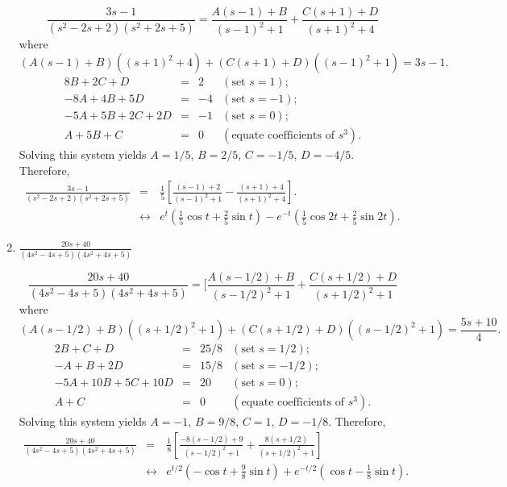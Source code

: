 \documentclass{ximera}
\begin{document}
\begin{problem}
\begin{enumerate}
\begin{solution}
$$
\frac{3s-1}{(s^2-2s+2)(s^2+2s+5)}
=\frac{A(s-1)+B}{(s-1)^2+1}+\frac{C(s+1)+D}{(s+1)^2+4}
$$
where
$$
(A(s-1)+B)((s+1)^2+4)+(C(s+1)+D)((s-1)^2+1)=3s-1.
$$
$$
\begin{array}{rcrl}
8B+2C+D&=&2&(\mbox{set }s=1);\\
-8A+4B+5D&=&-4& (\mbox{set }s=-1);\\
-5A+5B+2C+2D&=&-1&(\mbox{set }s=0);\\
A+5B+C&=&0&(\mbox{equate coefficients of }s^3).
\end{array}
$$
Solving this system yields $A=1/5$, $B=2/5$,
$C=-1/5$, $D=-4/5$. Therefore,
\begin{eqnarray*}
\frac{3s-1}{(s^2-2s+2)(s^2+2s+5)}
&=&
\frac{1}{5}\left[\frac{(s-1)+2}{(s-1)^2+1}-\frac{(s+1)+4}{(s+1)^2+4}\right].
\\&\leftrightarrow&
e^t\left(\frac{1}{5}\cos t+\frac{2}{5} \sin t\right)
-e^{-t}\left(\frac{1}{5}\cos 2t+\frac{2}{5}\sin 2t\right).
\end{eqnarray*}
\end{solution}
    
    \item $\frac{20s+40}{(4s^2-4s+5)(4s^2+4s+5)}$

\begin{solution}
$$
\frac{20s+40}{(4s^2-4s+5)(4s^2+4s+5)}
=[\frac{A(s-1/2)+B}{(s-1/2)^2+1}+
\frac{C(s+1/2)+D}{(s+1/2)^2+1}
$$
where
$$
(A(s-1/2)+B)((s+1/2)^2+1)+(C(s+1/2)+D)((s-1/2)^2+1)=\frac{5s+10}{4}.
$$
$$
\begin{array}{rcrl}
2B+C+D&=&25/8&(\mbox{set }s=1/2);\\
-A+B+2D&=&15/8& (\mbox{set }s=-1/2);\\
-5A+10B+5C+10D&=&20&(\mbox{set }s=0);\\
A+C&=&0&(\mbox{equate coefficients of }s^3).
\end{array}
$$
Solving this system yields $A=-1$, $B=9/8$,
$C=1$, $D=-1/8$. Therefore,
\begin{eqnarray*}
\frac{20s+40}{(4s^2-4s+5)(4s^2+4s+5)}
&=&
\frac{1}{8}\left[\frac{-8(s-1/2)+9}{(s-1/2)^2+1}+\frac{8(s+1/2)
}{(s+1/2)^2+1}\right] %
\\&\leftrightarrow&
e^{t/2}\left(-\cos t+\frac{9}{8}\sin
t\right)+e^{-t/2}\left(\cos t-\frac{1}{8}\sin t\right).
\end{eqnarray*}
\end{solution}    
\end{enumerate}
\end{problem}
\end{document}
